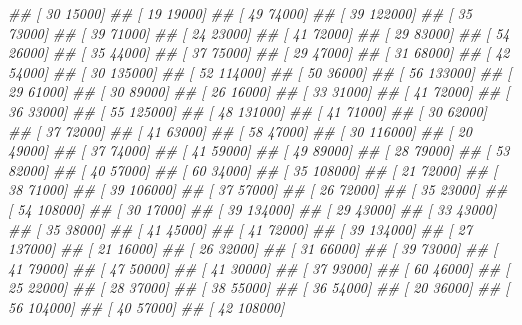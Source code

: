\documentclass[
]{book}
\newenvironment{Shaded}{\begin{snugshade}}{\end{snugshade}}
\newcommand{\CommentTok}[1]{\textcolor[rgb]{0.56,0.35,0.01}{\textit{#1}}}
\theoremstyle{definition}
\theoremstyle{definition}
\theoremstyle{definition}
\theoremstyle{definition}
\theoremstyle{remark}
\begin{document}
\begin{Shaded}
\begin{Highlighting}[]
\CommentTok{\#\#  [    30  15000]}
\CommentTok{\#\#  [    19  19000]}
\CommentTok{\#\#  [    49  74000]}
\CommentTok{\#\#  [    39 122000]}
\CommentTok{\#\#  [    35  73000]}
\CommentTok{\#\#  [    39  71000]}
\CommentTok{\#\#  [    24  23000]}
\CommentTok{\#\#  [    41  72000]}
\CommentTok{\#\#  [    29  83000]}
\CommentTok{\#\#  [    54  26000]}
\CommentTok{\#\#  [    35  44000]}
\CommentTok{\#\#  [    37  75000]}
\CommentTok{\#\#  [    29  47000]}
\CommentTok{\#\#  [    31  68000]}
\CommentTok{\#\#  [    42  54000]}
\CommentTok{\#\#  [    30 135000]}
\CommentTok{\#\#  [    52 114000]}
\CommentTok{\#\#  [    50  36000]}
\CommentTok{\#\#  [    56 133000]}
\CommentTok{\#\#  [    29  61000]}
\CommentTok{\#\#  [    30  89000]}
\CommentTok{\#\#  [    26  16000]}
\CommentTok{\#\#  [    33  31000]}
\CommentTok{\#\#  [    41  72000]}
\CommentTok{\#\#  [    36  33000]}
\CommentTok{\#\#  [    55 125000]}
\CommentTok{\#\#  [    48 131000]}
\CommentTok{\#\#  [    41  71000]}
\CommentTok{\#\#  [    30  62000]}
\CommentTok{\#\#  [    37  72000]}
\CommentTok{\#\#  [    41  63000]}
\CommentTok{\#\#  [    58  47000]}
\CommentTok{\#\#  [    30 116000]}
\CommentTok{\#\#  [    20  49000]}
\CommentTok{\#\#  [    37  74000]}
\CommentTok{\#\#  [    41  59000]}
\CommentTok{\#\#  [    49  89000]}
\CommentTok{\#\#  [    28  79000]}
\CommentTok{\#\#  [    53  82000]}
\CommentTok{\#\#  [    40  57000]}
\CommentTok{\#\#  [    60  34000]}
\CommentTok{\#\#  [    35 108000]}
\CommentTok{\#\#  [    21  72000]}
\CommentTok{\#\#  [    38  71000]}
\CommentTok{\#\#  [    39 106000]}
\CommentTok{\#\#  [    37  57000]}
\CommentTok{\#\#  [    26  72000]}
\CommentTok{\#\#  [    35  23000]}
\CommentTok{\#\#  [    54 108000]}
\CommentTok{\#\#  [    30  17000]}
\CommentTok{\#\#  [    39 134000]}
\CommentTok{\#\#  [    29  43000]}
\CommentTok{\#\#  [    33  43000]}
\CommentTok{\#\#  [    35  38000]}
\CommentTok{\#\#  [    41  45000]}
\CommentTok{\#\#  [    41  72000]}
\CommentTok{\#\#  [    39 134000]}
\CommentTok{\#\#  [    27 137000]}
\CommentTok{\#\#  [    21  16000]}
\CommentTok{\#\#  [    26  32000]}
\CommentTok{\#\#  [    31  66000]}
\CommentTok{\#\#  [    39  73000]}
\CommentTok{\#\#  [    41  79000]}
\CommentTok{\#\#  [    47  50000]}
\CommentTok{\#\#  [    41  30000]}
\CommentTok{\#\#  [    37  93000]}
\CommentTok{\#\#  [    60  46000]}
\CommentTok{\#\#  [    25  22000]}
\CommentTok{\#\#  [    28  37000]}
\CommentTok{\#\#  [    38  55000]}
\CommentTok{\#\#  [    36  54000]}
\CommentTok{\#\#  [    20  36000]}
\CommentTok{\#\#  [    56 104000]}
\CommentTok{\#\#  [    40  57000]}
\CommentTok{\#\#  [    42 108000]}

\end{Highlighting}
\end{Shaded}
\end{document}
